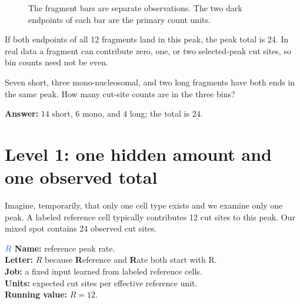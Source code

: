 \documentclass[11pt]{article}
\newcommand{\fixedq}[1]{\textcolor{fixedblue!75!black}{#1}}
\begin{document}
\begin{figure}[H]
\centering
{}
\caption{The fragment bars are separate observations. The two dark endpoints of each bar are the primary count units.}
\end{figure}

If both endpoints of all 12 fragments land in this peak, the peak total is 24.
In real data a fragment can contribute zero, one, or two selected-peak cut sites,
so bin counts need not be even.

\begin{checkpoint}
Seven short, three mono-nucleosomal, and two long fragments have both ends in the
same peak. How many cut-site counts are in the three bins?

\textbf{Answer:} \(14\) short, \(6\) mono, and \(4\) long; the total is \(24\).
\end{checkpoint}

\section{Level 1: one hidden amount and one observed total}

Imagine, temporarily, that only one cell type exists and we examine only one
peak. A labeled reference cell typically contributes 12 cut sites to this peak.
Our mixed spot contains 24 observed cut sites.

\begin{newvar}{\(\fixedq{R}\)}
\textbf{Name:} reference peak rate.\\
\textbf{Letter:} \(R\) because \textbf{R}eference and \textbf{R}ate both start with R.\\
\textbf{Job:} a fixed input learned from labeled reference cells.\\
\textbf{Units:} expected cut sites per effective reference unit.\\
\textbf{Running value:} \(R=12\).
\end{newvar}
\end{document}
